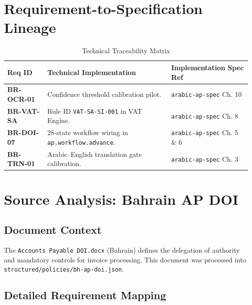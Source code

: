 \documentclass[11pt,a4paper,twoside]{report}
\begin{document}
\chapter{Requirement-to-Specification Lineage}
\label{ch:lineage}

\begin{longtable}{p{2cm} p{6cm} p{6cm}}
\caption{Technical Traceability Matrix} \\
\toprule
\textbf{Req ID} & \textbf{Technical Implementation} & \textbf{Implementation Spec Ref} \\
\midrule
\rowcolor{sapamber!5}
\textbf{BR-OCR-01} & Confidence threshold calibration pilot. & \texttt{arabic-ap-spec} Ch. 10 \\
\textbf{BR-VAT-SA} & Rule ID \texttt{VAT-SA-SI-001} in VAT Engine. & \texttt{arabic-ap-spec} Ch. 8 \\
\rowcolor{sapamber!5}
\textbf{BR-DOI-07} & 28-state workflow wiring in \texttt{ap.workflow.advance}. & \texttt{arabic-ap-spec} Ch. 5 \& 6 \\
\textbf{BR-TRN-01} & Arabic--English translation gate calibration. & \texttt{arabic-ap-spec} Ch. 3 \\
\bottomrule
\end{longtable}

\chapter{Source Analysis: Bahrain AP DOI}
\label{ch:analysis-bh-doi}

\section{Document Context}
The \texttt{Accounts Payable DOI.docx} (Bahrain) defines the delegation of authority and mandatory controls for invoice processing. This document was processed into \texttt{structured/policies/bh-ap-doi.json}.

\section{Detailed Requirement Mapping}
\end{document}
